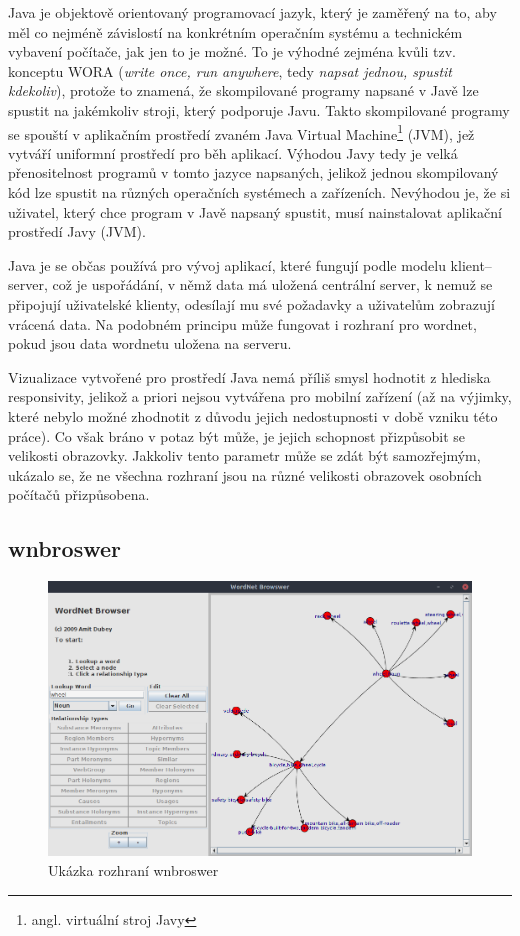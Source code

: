 \documentclass[a4paper, 11pt, oneside]{book}
\begin{document}
				Java je objektově orientovaný programovací jazyk, který je zaměřený na to, aby měl co nejméně závislostí na konkrétním operačním systému a technickém vybavení počítače, jak jen to je možné. To je výhodné zejména kvůli tzv. konceptu WORA (\textit{write once, run anywhere}, tedy \textit{napsat jednou, spustit kdekoliv}), protože to znamená, že skompilované programy napsané v Javě lze spustit na jakémkoliv stroji, který podporuje Javu. Takto skompilované programy se spouští v aplikačním prostředí zvaném Java Virtual Machine\footnote{angl. virtuální stroj Javy} (JVM), jež vytváří uniformní prostředí pro běh aplikací. Výhodou Javy tedy je velká přenositelnost programů v tomto jazyce napsaných, jelikož jednou skompilovaný kód lze spustit na různých operačních systémech a zařízeních. Nevýhodou je, že si uživatel, který chce program v Javě napsaný spustit, musí nainstalovat aplikační prostředí Javy (JVM). 

				Java je se občas používá pro vývoj aplikací, které fungují podle modelu klient--server, což je uspořádání, v němž data má uložená centrální server, k nemuž se připojují uživatelské klienty, odesílají mu své požadavky a uživatelům zobrazují vrácená data. \parencite[13]{gosling1995java} Na podobném principu může fungovat i rozhraní pro wordnet, pokud jsou data wordnetu uložena na serveru.

				Vizualizace vytvořené pro prostředí Java nemá příliš smysl hodnotit z hlediska responsivity, jelikož a priori nejsou vytvářena pro mobilní zařízení (až na výjimky, které nebylo možné zhodnotit z důvodu jejich nedostupnosti v době vzniku této práce). Co však bráno v potaz být může, je jejich schopnost přizpůsobit se velikosti obrazovky. Jakkoliv tento parametr může se zdát být samozřejmým, ukázalo se, že ne všechna rozhraní jsou na různé velikosti obrazovek osobních počítačů přizpůsobena.

				\subsection{wnbroswer}

					\begin{figure}[h]
						\centering
						\includegraphics[width=1.0\textwidth]{wnwordnetbrowswer.png}
						\caption{Ukázka rozhraní wnbroswer}
						\label{fig:wnwordnetbrowswer}
					\end{figure}
\end{document}
